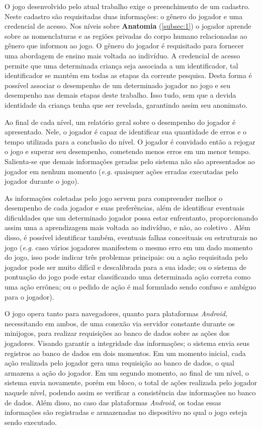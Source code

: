 O jogo desenvolvido pelo atual trabalho exige o preenchimento de um cadastro. Neste cadastro são requisitadas duas informações: o gênero do jogador e uma credencial de acesso. Nos níveis sobre \textbf{Anatomia} (\autoref{subsec:1}) o jogador aprende sobre as nomenclaturas e as regiões privadas do corpo humano relacionadas ao gênero que informou ao jogo. O gênero do jogador é requisitado para fornecer uma abordagem de ensino mais voltada ao indivíduo. A credencial de acesso permite que uma determinada criança seja associada a um identificador, tal identificador se mantém em todas as etapas da corrente pesquisa. Desta forma é possível associar o desempenho de um determinado jogador no jogo e seu desempenho nas demais etapas deste trabalho. Isso tudo, sem que a devida identidade da criança tenha que ser revelada, garantindo assim seu anonimato. 

Ao final de cada nível, um relatório geral sobre o desempenho do jogador é apresentado. Nele, o jogador é capaz de identificar sua quantidade de erros e o tempo utilizada para a conclusão do nível. O jogador é convidado então a rejogar o jogo e superar seu desempenho, cometendo menos erros em um menor tempo. Salienta-se que demais informações geradas pelo sistema não são apresentados ao jogador em nenhum momento (\textit{e.g.} quaisquer ações erradas executadas pelo jogador durante o jogo). 

As informações coletadas pelo jogo servem para compreender melhor o desempenho de cada jogador e suas preferências, além de identificar eventuais dificuldades que um determinado jogador possa estar enfrentanto, proporcionando assim uma a aprendizagem mais voltada ao indivíduo, e não, ao coletivo \cite{carrara2018criancca}. Além disso, é possível identificar também, eventuais falhas conceituais ou estruturais no jogo (\textit{e.g.} caso vários jogadores manifestem o mesmo erro em um dado momento do jogo, isso pode indicar três problemas principais: ou a ação requisitada pelo jogador pode ser muito difícil e descalibrada para a sua idade; ou o sistema de pontuação do jogo pode estar classificando uma determinada ação correta como uma ação errônea; ou o pedido de ação é mal formulado sendo confuso e ambíguo para o jogador).

O jogo opera tanto para navegadores, quanto para plataformas \textit{Android}, necessitando em ambos, de uma conexão via servidor constante durante os minijogos, para realizar requisições ao banco de dados sobre as ações dos jogadores. Visando garantir a integridade das informações; o sistema envia seus registros ao banco de dados em dois momentos. Em um momento inicial, cada ação realizada pelo jogador gera uma requisição ao banco de dados, o qual armazena a ação do jogador. Em um segundo momento, ao final de um nível, o sistema envia novamente, porém em bloco, o total de ações realizada pelo jogador naquele nível, podendo assim se verificar a consistência das informações no banco de dados. Além disso, no caso das plataformas \textit{Android}, os todas essas informações são registradas e armazenadas no dispositivo no qual o jogo esteja sendo executado.

